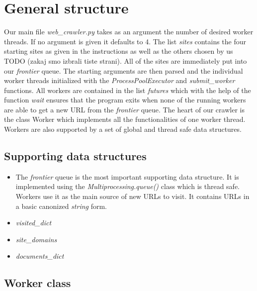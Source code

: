 \documentclass[runningheads]{llncs}
\begin{document}
\section{General structure}
Our main file \textit{web\_crawler.py} takes as an argument the number of desired worker threads. If no argument is given it defaults to 4. The list \textit{sites} contains the four starting sites as given in the instructions as well as the others chosen by us TODO (zakaj smo izbrali tiste strani). All of the sites are immediately put into our \textit{frontier} queue. The starting arguments are then parsed and the individual worker threads initialized with the \textit{ProcessPoolExecutor} and \textit{submit\_worker} functions. All workers are contained in the list \textit{futures} which with the help of the function \textit{wait} ensures that the program exits when none of the running workers are able to get a new URL from the \textit{frontier} queue.
The heart of our crawler is the class Worker which implements all the functionalities of one worker thread. Workers are also supported by a set of global and thread safe data structures. 

\subsection{Supporting data structures}
\begin{itemize}
  \item The \textit{frontier} queue is the most important supporting data structure. It is implemented using the \textit{Multiprocessing.queue()} class which is thread safe. Workers use it as the main source of new URLs to visit. It contains URLs in a basic canonized \textit{string} form.
  \item \textit{visited\_dict}
  \item \textit{site\_domains}
  \item \textit{documents\_dict}
\end{itemize}

\subsection{Worker class}





 
 
 
\end{document}
